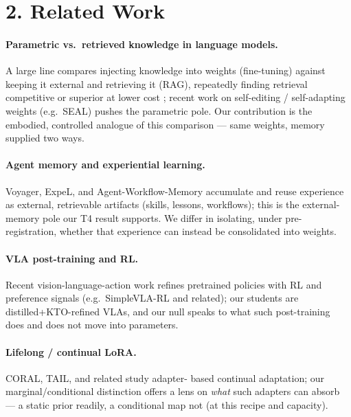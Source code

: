 \section*{2. Related Work}


\paragraph{Parametric vs.\ retrieved knowledge in language models.} A large line
compares injecting knowledge into weights (fine-tuning) against keeping
it external and retrieving it (RAG), repeatedly finding retrieval
competitive or superior at lower cost ; recent work
on self-editing / self-adapting weights (e.g.\ SEAL) pushes the
parametric pole. Our contribution is the embodied, controlled analogue
of this comparison --- same weights, memory supplied two ways.

\paragraph{Agent memory and experiential learning.} Voyager, ExpeL, and
Agent-Workflow-Memory accumulate and reuse experience as external,
retrievable artifacts (skills, lessons, workflows); this is the
external-memory pole our T4 result supports. We differ in isolating,
under pre-registration, whether that experience can instead be
consolidated into weights.

\paragraph{VLA post-training and RL.} Recent vision-language-action work
refines pretrained policies with RL and preference signals (e.g.\
SimpleVLA-RL and related); our students are distilled+KTO-refined VLAs,
and our null speaks to what such post-training does and does not move
into parameters.

\paragraph{Lifelong / continual LoRA.} CORAL, TAIL, and related study adapter-%
based continual adaptation; our marginal/conditional distinction
offers a lens on \emph{what} such adapters can absorb --- a static prior
readily, a conditional map not (at this recipe and capacity).

